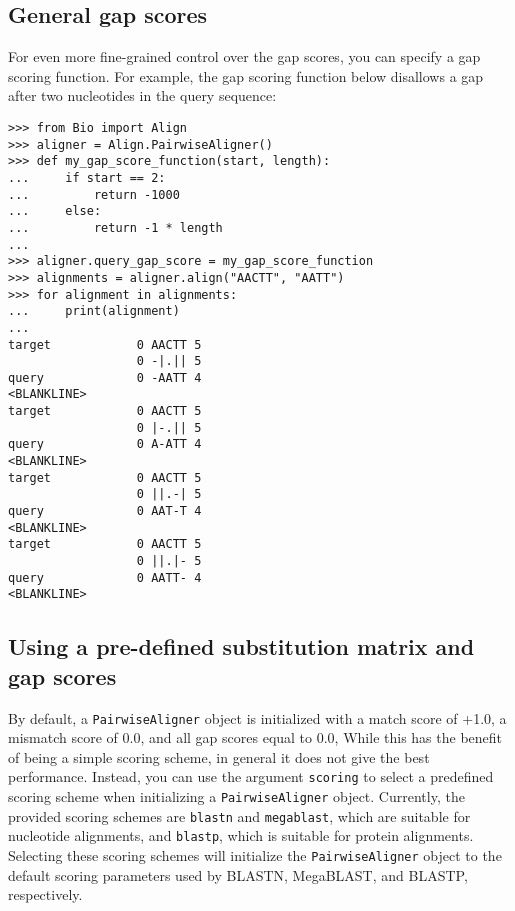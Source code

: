 \subsection{General gap scores}
\label{sec:pairwise-general-gapscores}

For even more fine-grained control over the gap scores, you can specify a gap scoring function. For example, the gap scoring function below disallows a gap after two nucleotides in the query sequence:

\begin{verbatim}
>>> from Bio import Align
>>> aligner = Align.PairwiseAligner()
>>> def my_gap_score_function(start, length):
...     if start == 2:
...         return -1000
...     else:
...         return -1 * length
...
>>> aligner.query_gap_score = my_gap_score_function
>>> alignments = aligner.align("AACTT", "AATT")
>>> for alignment in alignments:
...     print(alignment)
...
target            0 AACTT 5
                  0 -|.|| 5
query             0 -AATT 4
<BLANKLINE>
target            0 AACTT 5
                  0 |-.|| 5
query             0 A-ATT 4
<BLANKLINE>
target            0 AACTT 5
                  0 ||.-| 5
query             0 AAT-T 4
<BLANKLINE>
target            0 AACTT 5
                  0 ||.|- 5
query             0 AATT- 4
<BLANKLINE>
\end{verbatim}

\subsection{Using a pre-defined substitution matrix and gap scores}
\label{sec:pairwise-predefined-scoring}

By default, a \verb+PairwiseAligner+ object is initialized with a match score of +1.0, a mismatch score of 0.0, and all gap scores equal to 0.0, While this has the benefit of being a simple scoring scheme, in general it does not give the best performance. Instead, you can use the argument \verb+scoring+ to select a predefined scoring scheme when initializing a \verb+PairwiseAligner+ object. Currently, the provided scoring schemes are \verb+blastn+ and \verb+megablast+, which are suitable for nucleotide alignments, and \verb+blastp+, which is suitable for protein alignments. Selecting these scoring schemes will initialize the \verb+PairwiseAligner+ object to the default scoring parameters used by BLASTN, MegaBLAST, and BLASTP, respectively.

